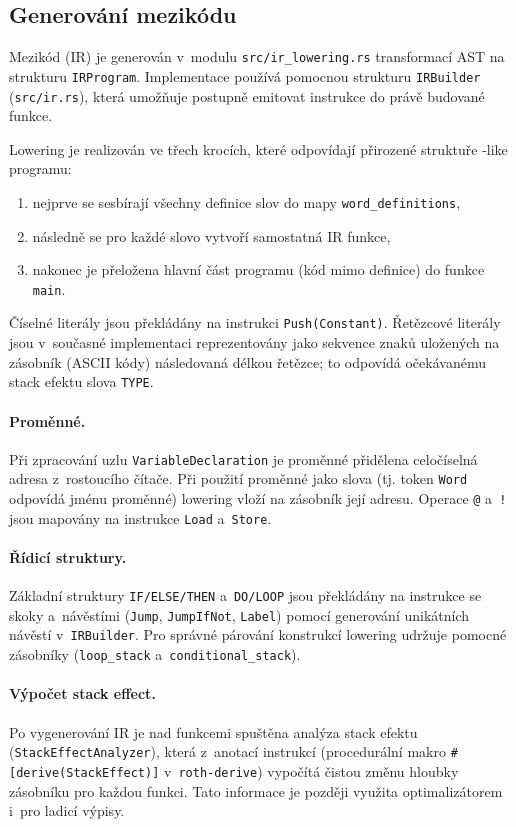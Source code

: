 \subsection{Generování mezikódu}
\label{sec:ir}

Mezikód (IR) je generován v~modulu \texttt{src/ir\_lowering.rs} transformací
AST na strukturu \texttt{IRProgram}. Implementace používá pomocnou strukturu
\texttt{IRBuilder} (\texttt{src/ir.rs}), která umožňuje postupně emitovat
instrukce do právě budované funkce.

Lowering je realizován ve třech krocích, které odpovídají přirozené struktuře
\Forth{}-like programu:
\begin{enumerate}
	\item nejprve se sesbírají všechny definice slov do mapy \texttt{word\_definitions},
	\item následně se pro každé slovo vytvoří samostatná IR funkce,
	\item nakonec je přeložena hlavní část programu (kód mimo definice) do funkce \texttt{main}.
\end{enumerate}

Číselné literály jsou překládány na instrukci \texttt{Push(Constant)}.
Řetězcové literály jsou v~současné implementaci reprezentovány jako sekvence
znaků uložených na zásobník (ASCII kódy) následovaná délkou řetězce; to
odpovídá očekávanému stack efektu slova \texttt{TYPE}.

\paragraph{Proměnné.}
Při zpracování uzlu \texttt{VariableDeclaration} je proměnné přidělena celočíselná
adresa z~rostoucího čítače. Při použití proměnné jako slova (tj. token \texttt{Word}
odpovídá jménu proměnné) lowering vloží na zásobník její adresu.
Operace \texttt{@} a~\texttt{!} jsou mapovány na instrukce \texttt{Load} a~\texttt{Store}.

\paragraph{Řídicí struktury.}
Základní struktury \texttt{IF/ELSE/THEN} a~\texttt{DO/LOOP} jsou překládány na
instrukce se skoky a~návěstími (\texttt{Jump}, \texttt{JumpIfNot}, \texttt{Label})
pomocí generování unikátních návěstí v~\texttt{IRBuilder}. Pro správné párování
konstrukcí lowering udržuje pomocné zásobníky (\texttt{loop\_stack} a~\texttt{conditional\_stack}).

\paragraph{Výpočet stack effect.}
Po vygenerování IR je nad funkcemi spuštěna analýza stack efektu
(\texttt{StackEffectAnalyzer}), která z~anotací instrukcí (procedurální makro
\texttt{\#[derive(StackEffect)]} v~\texttt{roth-derive}) vypočítá čistou změnu
hloubky zásobníku pro každou funkci. Tato informace je později využita
optimalizátorem i~pro ladicí výpisy.
